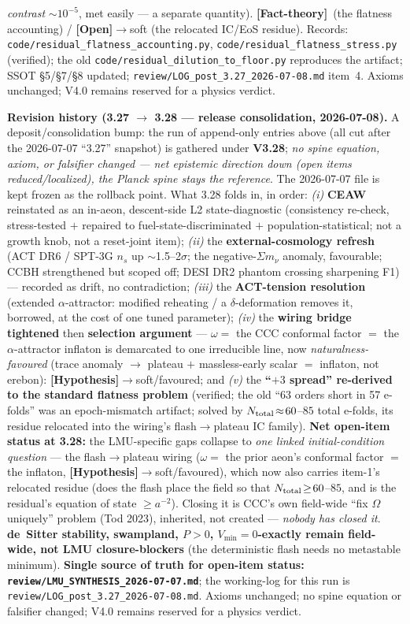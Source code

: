 \documentclass[11pt]{article}
\newcommand{\factth}{\textcolor{green!40!black}{\textbf{[Fact-theory]}}}
\newcommand{\hyp}{\textcolor{orange!80!black}{\textbf{[Hypothesis]}}}
\newcommand{\open}{\textcolor{red!70!black}{\textbf{[Open]}}}
\begin{document}
{\emph{contrast} $\sim\!10^{-5}$, met easily --- a separate quantity). \factth\ (the flatness accounting) / \open$\to$soft (the relocated IC/EoS residue). Records: \texttt{code/residual\_flatness\_accounting.py}, \texttt{code/residual\_flatness\_stress.py} (verified); the old \texttt{code/residual\_dilution\_to\_floor.py} reproduces the artifact; SSOT \S5/\S7/\S8 updated; \texttt{review/LOG\_post\_3.27\_2026-07-08.md} item~4. Axioms unchanged; V4.0 remains reserved for a physics verdict.

\smallskip\noindent\textbf{Revision history (3.27 $\to$ 3.28 --- release consolidation, 2026-07-08).} A deposit/consolidation bump: the run of append-only entries above (all cut after the 2026-07-07 ``3.27'' snapshot) is gathered under \textbf{V3.28}; \emph{no spine equation, axiom, or falsifier changed --- net epistemic direction down (open items reduced/localized), the Planck spine stays the reference}. The 2026-07-07 file is kept frozen as the rollback point. What 3.28 folds in, in order: \emph{(i)} \textbf{CEAW} reinstated as an in-aeon, descent-side L2 state-diagnostic (consistency re-check, stress-tested $+$ repaired to fuel-state-discriminated $+$ population-statistical; not a growth knob, not a reset-joint item); \emph{(ii)} the \textbf{external-cosmology refresh} (ACT DR6 / SPT-3G $n_s$ up $\sim$1.5--2$\sigma$; the negative-$\Sigma m_\nu$ anomaly, favourable; CCBH strengthened but scoped off; DESI DR2 phantom crossing sharpening F1) --- recorded as drift, no contradiction; \emph{(iii)} the \textbf{ACT-tension resolution} (extended $\alpha$-attractor: modified reheating / a $\delta$-deformation removes it, borrowed, at the cost of one tuned parameter); \emph{(iv)} the \textbf{wiring bridge tightened} then \textbf{selection argument} --- $\omega=$ the CCC conformal factor $=$ the $\alpha$-attractor inflaton is demarcated to one irreducible line, now \emph{naturalness-favoured} (trace anomaly $\to$ plateau $+$ massless-early scalar $=$ inflaton, not erebon): \hyp$\to$soft/favoured; and \emph{(v)} the \textbf{``$+3$ spread'' re-derived to the standard flatness problem} (verified; the old ``63 orders short in 57 e-folds'' was an epoch-mismatch artifact; solved by $N_{\rm total}\!\approx\!60$--$85$ total e-folds, its residue relocated into the wiring's flash$\to$plateau IC family). \textbf{Net open-item status at 3.28:} the LMU-specific gaps collapse to \emph{one linked initial-condition question} --- the flash$\to$plateau wiring ($\omega=$ the prior aeon's conformal factor $=$ the inflaton, \hyp$\to$soft/favoured), which now also carries item-1's relocated residue (does the flash place the field so that $N_{\rm total}\!\ge\!60$--$85$, and is the residual's equation of state $\ge a^{-2}$). Closing it is CCC's own field-wide ``fix $\Omega$ uniquely'' problem (Tod 2023), inherited, not created --- \emph{nobody has closed it}. \textbf{de~Sitter stability, swampland, $P>0$, $V_{\min}=0$-exactly remain field-wide, not LMU closure-blockers} (the deterministic flash needs no metastable minimum). \textbf{Single source of truth for open-item status: \texttt{review/LMU\_SYNTHESIS\_2026-07-07.md}}; the working-log for this run is \texttt{review/LOG\_post\_3.27\_2026-07-08.md}. Axioms unchanged; no spine equation or falsifier changed; V4.0 remains reserved for a physics verdict.

}
\end{document}

